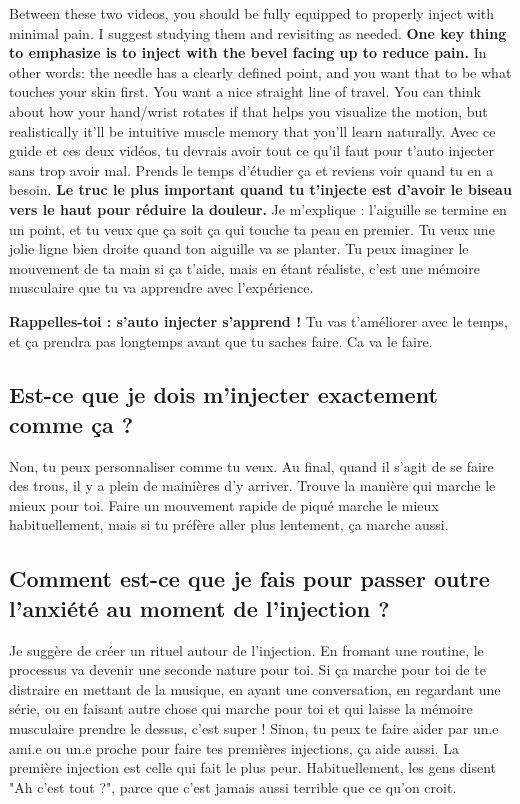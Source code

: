 \documentclass{article}
\begin{document}
Between these two videos, you should be fully equipped to properly inject with minimal pain. I suggest studying them and revisiting as needed. \textbf{One key thing to emphasize is to inject with the bevel facing up to reduce pain.} In other words: the needle has a clearly defined point, and you want that to be what touches your skin first. You want a nice straight line of travel. You can think about how your hand/wrist rotates if that helps you visualize the motion, but realistically it'll be intuitive muscle memory that you'll learn naturally.
Avec ce guide et ces deux vidéos, tu devrais avoir tout ce qu'il faut pour t'auto injecter sans trop avoir mal. Prends le temps d'étudier ça et reviens voir quand tu en a besoin. \textbf{Le truc le plus important quand tu t'injecte est d'avoir le biseau vers le haut pour réduire la douleur.} Je m'explique : l'aiguille se termine en un point, et tu veux que ça soit ça qui touche ta peau en premier. Tu veux une jolie ligne bien droite quand ton aiguille va se planter. Tu peux imaginer le mouvement de ta main si ça t'aide, mais en étant réaliste, c'est une mémoire musculaire que tu va apprendre avec l'expérience.

\textbf{Rappelles-toi : s'auto injecter s'apprend ! } Tu vas t'améliorer avec le temps, et ça prendra pas longtemps avant que tu saches faire. Ca va le faire.

\subsection{Est-ce que je dois m'injecter exactement comme ça ?}

Non, tu peux personnaliser comme tu veux. Au final, quand il s'agit de se faire des trous, il y a plein de mainières d'y arriver. Trouve la manière qui marche le mieux pour toi. Faire un mouvement rapide de piqué marche le mieux habituellement, mais si tu préfère aller plus lentement, ça marche aussi. 

\subsection{Comment est-ce que je fais pour passer outre l'anxiété au moment de l'injection ?}

Je suggère de créer un rituel autour de l'injection. En fromant une routine, le processus va devenir une seconde nature pour toi. Si ça marche pour toi de te distraire en mettant de la musique, en ayant une conversation, en regardant une série, ou en faisant autre chose qui marche pour toi et qui laisse la mémoire musculaire prendre le dessus, c'est super ! Sinon, tu peux te faire aider par un.e ami.e ou un.e proche pour faire tes premières injections, ça aide aussi. La première injection est celle qui fait le plus peur. Habituellement, les gens disent "Ah c'est tout ?", parce que c'est jamais aussi terrible que ce qu'on croit.
\end{document}
